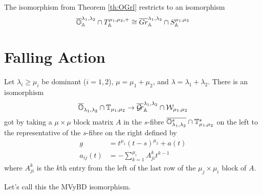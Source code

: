 \documentclass{article}
\begin{document}
\begin{theorem}
    The isomorphism from Theorem \ref{th:OGrl} restricts to an isomorphism
    $$ \overline{\mathbb O}^{\lambda_1, \lambda_2}_\mathbb A \cap T^{\mu_1, \mu_2, +}_\mathbb A \cong \overline{Gr}^{\lambda_1, \lambda_2}_\mathbb A \cap S^{\mu_1, \mu_2}_\mathbb A$$
\end{theorem}


\section{Falling Action} %

\begin{theorem}
    Let $\lambda_i\ge\mu_i$ be dominant ($i=1,2$), $\mu = \mu_1 +\mu_2$, and $\lambda =\lambda_1+\lambda_2$. 
    There is an isomorphism 
    \begin{equation}
        \overline{\mathbb O}_{\lambda_1,\lambda_2}\cap\mathbb T_{\mu_1,\mu_2} \to \overline{\mathcal{G}\!r}_\mathbb A^{\lambda_1,\lambda_2}\cap \mathcal W_{\mu_1,\mu_2}
    \end{equation}
    got by taking a $\mu\times\mu$ block matrix $A$ in the $s$-fibre $\overline{\mathbb O_{\lambda_1,\lambda_2}^s}\cap\mathbb T_{\mu_1,\mu_2}^s$ on the left to the representative of the $s$-fibre on the right defined by  
    \begin{equation}
        \begin{split}
            g &= t^{\mu_1} (t-s)^{\mu_2} + a(t) \\
            a_{ij}(t) &= - \sum_{k=1}^{\mu_i} A^k_{ji} t^{k-1}
        \end{split}
    \end{equation}
    where $A^k_{ji}$ is the $k$th entry from the left of the last row of the $\mu_j\times\mu_i$ block of $A$. 
\end{theorem}

Let's call this the MVyBD isomorphism.
\end{document}
